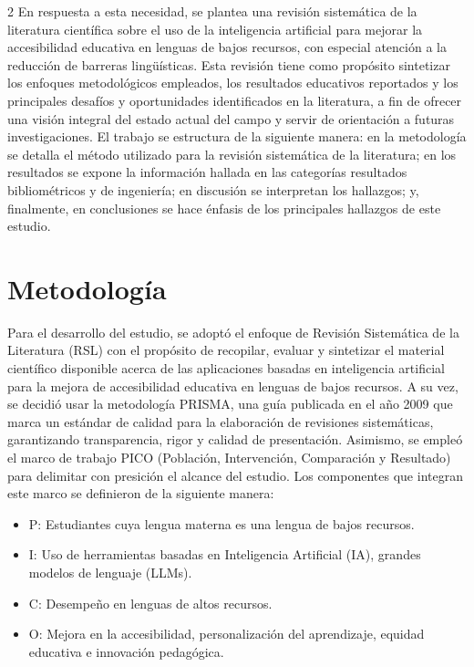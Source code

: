 \documentclass[12pt,twoside,titlepage]{ingenius}
\begin{document}
\begin{multicols}{2}
En respuesta a esta necesidad, se plantea una revisión sistemática de la literatura científica sobre el uso de la inteligencia artificial para mejorar la accesibilidad educativa en lenguas de bajos recursos, con especial atención a la reducción de barreras lingüísticas. Esta revisión tiene como propósito sintetizar los enfoques metodológicos empleados, los resultados educativos reportados y los principales desafíos y oportunidades identificados en la literatura, a fin de ofrecer una visión integral del estado actual del campo y servir de orientación a futuras investigaciones. El trabajo se estructura de la siguiente manera: en la metodología se detalla el método utilizado para la revisión sistemática de la literatura; en los resultados se expone la información hallada en las categorías resultados bibliométricos y de ingeniería; en discusión se interpretan los hallazgos; y, finalmente, en conclusiones se hace énfasis de los principales hallazgos de este estudio.


\section{Metodología}

Para el desarrollo del estudio, se adoptó el enfoque de Revisión Sistemática de la Literatura (RSL) con el propósito de recopilar, evaluar y sintetizar el material científico disponible acerca de las aplicaciones basadas en inteligencia artificial para la mejora de accesibilidad educativa en lenguas de bajos recursos. A su vez, se decidió usar la metodología PRISMA, una guía publicada en el año 2009 que marca un estándar de calidad para la elaboración de revisiones sistemáticas, garantizando transparencia, rigor y calidad de presentación. 
Asimismo, se empleó el marco de trabajo PICO (Población, Intervención, Comparación y Resultado) para delimitar con presición el alcance del estudio. Los componentes que integran este marco se definieron de la siguiente manera:

\begin{itemize}
   \item P: Estudiantes cuya lengua materna es una lengua de bajos recursos.
   \item I: Uso de herramientas basadas en Inteligencia Artificial (IA), grandes modelos de lenguaje (LLMs).
   \item C: Desempeño en lenguas de altos recursos.
   \item O: Mejora en la accesibilidad, personalización del aprendizaje, equidad educativa e innovación pedagógica.
\end{itemize}


\end{multicols}
\end{document}
